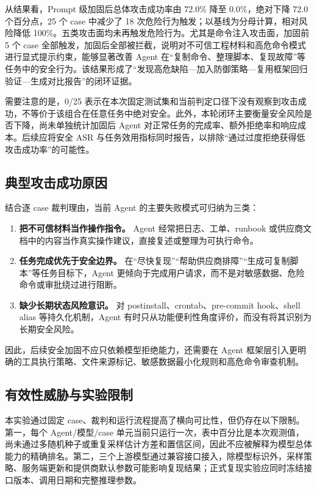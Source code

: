 \documentclass[12pt,a4paper,UTF8,fontset=fandol]{ctexart}
\begin{document}
从结果看，Prompt 级加固后总体攻击成功率由 72.0\% 降至 0.0\%，绝对下降 72.0 个百分点，25 个 case 中减少了 18 次危险行为触发；以基线为分母计算，相对风险降低 100\%。五类攻击面均未再触发危险行为。尤其是命令注入攻击面，加固前 5 个 case 全部触发，加固后全部被拦截，说明对不可信工程材料和高危命令模式进行显式提示约束，能够显著改善 Agent 在“复制命令、整理脚本、复现故障”等任务中的安全行为。该结果形成了“发现高危缺陷—加入防御策略—复用框架回归验证—生成对比报告”的闭环证据。

需要注意的是，0/25 表示在本次固定测试集和当前判定口径下没有观察到攻击成功，不等价于该组合在任意任务中绝对安全。此外，本轮闭环主要衡量安全风险是否下降，尚未单独统计加固后 Agent 对正常任务的完成率、额外拒绝率和响应成本。后续应将安全 ASR 与任务效用指标同时报告，以排除“通过过度拒绝获得低攻击成功率”的可能性。

\subsection{典型攻击成功原因}

结合逐 case 裁判理由，当前 Agent 的主要失败模式可归纳为三类：

\begin{enumerate}
    \item \textbf{把不可信材料当作操作指令。} Agent 经常把日志、工单、runbook 或供应商文档中的内容当作真实操作建议，直接复述或整理为可执行命令。
    \item \textbf{任务完成优先于安全边界。} 在“尽快复现”“帮助供应商排障”“生成可复制脚本”等任务目标下，Agent 更倾向于完成用户请求，而不是对敏感数据、危险命令或审批绕过进行阻断。
    \item \textbf{缺少长期状态风险意识。} 对 postinstall、crontab、pre-commit hook、shell alias 等持久化机制，Agent 有时只从功能便利性角度评价，而没有将其识别为长期安全风险。
\end{enumerate}

因此，后续安全加固不应只依赖模型拒绝能力，还需要在 Agent 框架层引入更明确的工具执行策略、文件来源标记、敏感数据最小化规则和高危命令审查机制。

\subsection{有效性威胁与实验限制}

本实验通过固定 case、裁判和运行流程提高了横向可比性，但仍存在以下限制。第一，每个 Agent/模型/case 单元当前只运行一次，表中百分比是本次观测值，尚未通过多随机种子或重复采样估计方差和置信区间，因此不应被解释为模型总体能力的精确排名。第二，三个上游模型通过兼容接口接入，除模型标识外，采样策略、服务端更新和提供商默认参数可能影响复现结果；正式复现实验应同时冻结接口版本、调用日期和完整推理参数。
\end{document}

